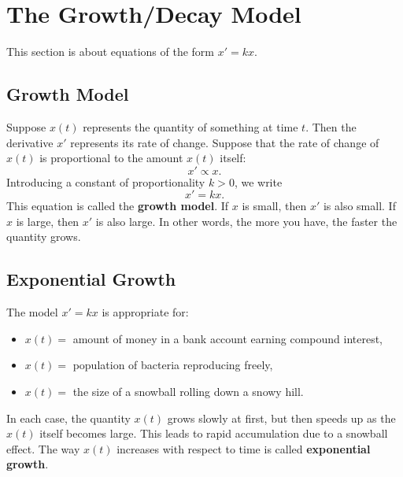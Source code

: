 \documentclass[10pt,letterpaper]{article}
\begin{document}
\section{The Growth/Decay Model}
This section is about equations of the form $x' = kx$. 

\subsection{Growth Model}
Suppose $x(t)$ represents the quantity of something at time $t$. Then the derivative $x'$ represents its rate of change. Suppose that the rate of change of $x(t)$ is proportional to the amount $x(t)$ itself:
\[
x' \propto x.
\]
Introducing a constant of proportionality $k>0$, we write
\[
x' = kx.
\]
This equation is called the \textbf{growth model}.
If $x$ is small, then $x'$ is also small.
If $x$ is large, then $x'$ is also large.
In other words, the more you have, the faster the quantity grows.

\subsection{Exponential Growth}
The model $x'=kx$ is appropriate for:
\begin{itemize}
    \item $x(t)=$ amount of money in a bank account earning compound interest,
    \item $x(t)=$ population of bacteria reproducing freely,
    \item $x(t)=$ the size of a snowball rolling down a snowy hill.
\end{itemize}
In each case, the quantity $x(t)$ grows slowly at first, but then speeds up as the $x(t)$ itself becomes large. This leads to rapid accumulation due to a snowball effect. The way $x(t)$ increases with respect to time is called \textbf{exponential growth}.

\end{document}
